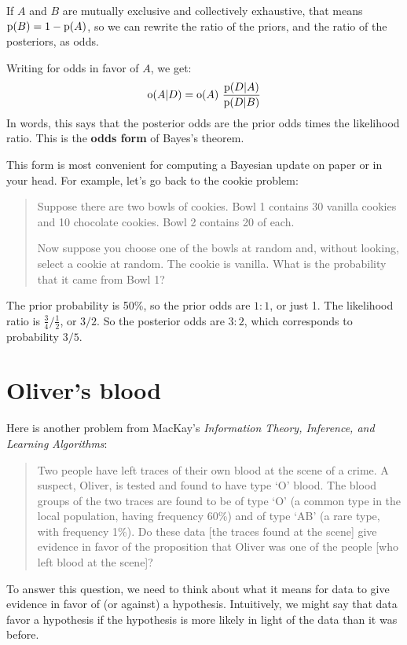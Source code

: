 \documentclass[12pt]{book}
\begin{document}
If $A$ and $B$ are mutually exclusive and collectively exhaustive,
that means $\mathrm{p}(B) = 1 - \mathrm{p}(A)$, so we can rewrite the ratio of
the priors, and the ratio of the posteriors, as odds.

Writing  for odds in favor of $A$, we get:
%
\[ \mathrm{o}(A|D) = \mathrm{o}(A)~\frac{\mathrm{p}(D|A)}{\mathrm{p}(D|B)} \]
%
In words, this says that the posterior odds are the prior odds times
the likelihood ratio.  This is the {\bf odds form} of Bayes's theorem.

This form is most convenient for computing a Bayesian update on
paper or in your head.  For example, let's go back to the
cookie problem:

\begin{quote}
Suppose there are two bowls of cookies.  Bowl 1 contains
  30 vanilla cookies and 10 chocolate cookies.  Bowl 2 contains 20 of
  each.

Now suppose you choose one of the bowls at random and, without looking,
select a cookie at random.  The cookie is vanilla.  What is the probability
that it came from Bowl 1?
\end{quote}

The prior probability is 50\%, so the prior odds are $1:1$, or just
1.  The likelihood ratio is $\frac{3}{4} / \frac{1}{2}$, or $3/2$.
So the posterior odds are $3:2$, which corresponds to probability
$3/5$.


\section{Oliver's blood}
\label{oliver}

Here is another problem from MacKay's {\it Information Theory,
  Inference, and Learning Algorithms}:

\begin{quote}
Two people have left traces of their own blood at the scene of
a crime.  A suspect, Oliver, is tested and found to have type
`O' blood.  The blood groups of the two traces are found to
be of type `O' (a common type in the local population, having frequency
60\%) and of type `AB' (a rare type, with frequency 1\%).
Do these data [the traces found at the scene] give evidence
in favor of the proposition that Oliver was one of the people
[who left blood at the scene]?
\end{quote}

To answer this question, we need to think about what it means
for data to give evidence in favor of (or against) a hypothesis.
Intuitively, we might say that data favor a hypothesis if the
hypothesis is more likely in light of the data than it was before.
\end{document}
